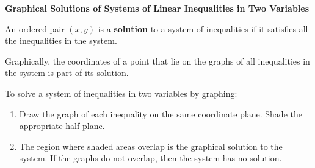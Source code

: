 \begin{center}
\textbf{Graphical Solutions of Systems of Linear Inequalities in Two Variables}
\end{center}

\vspace*{1ex}

An ordered pair $(x, y)$ is a \textbf{solution} to a system of inequalities if it satisfies all the inequalities in the system.

\vspce 

Graphically, the coordinates of a point that lie on the graphs of all inequalities in the system is part of its solution.

\vspce 

To solve a system of inequalities in two variables by graphing: 
\begin{enumerate}[label = \arabic*. ]
\item Draw the graph of each inequality on the same coordinate plane. Shade the appropriate half-plane. 
\item The region where shaded areas overlap is the graphical solution to the system. If the graphs do not overlap, then the system has no solution.

\end{enumerate}   




